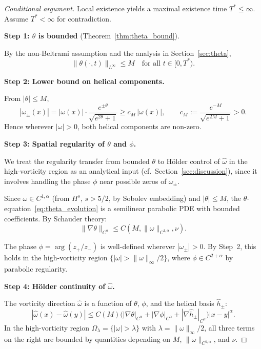 \documentclass[12pt,a4paper]{article}
\theoremstyle{definition}
\newcommand{\norm}[1]{\lVert #1 \rVert}
\begin{document}
\begin{proof}[Conditional argument]
Local existence yields a maximal existence time $T^* \leq \infty$. Assume $T^* < \infty$ for contradiction.

\medskip\noindent\textbf{Step 1: $\theta$ is bounded} (Theorem~\ref{thm:theta_bound}).

By the non-Beltrami assumption and the analysis in Section~\ref{sec:theta},
\begin{equation}
  \norm{\theta(\cdot,t)}_{L^\infty} \leq M \quad \text{for all } t \in [0, T^*).
\end{equation}

\medskip\noindent\textbf{Step 2: Lower bound on helical components.}

From $|\theta| \leq M$,
\begin{equation}
  |\omega_\pm(x)| = |\omega(x)| \cdot \frac{e^{\pm\theta}}{\sqrt{e^{2\theta} + 1}}
    \geq c_M\,|\omega(x)|, \qquad
  c_M := \frac{e^{-M}}{\sqrt{e^{2M}+1}} > 0.
\end{equation}
Hence wherever $|\omega| > 0$, both helical components are non-zero.

\medskip\noindent\textbf{Step 3: Spatial regularity of $\theta$ and $\phi$.}

We treat the regularity transfer from bounded $\theta$ to H\"older control of $\hat{\omega}$
in the high-vorticity region as an analytical input (cf.\ Section~\ref{sec:discussion}),
since it involves handling the phase $\phi$ near possible zeros of $\omega_\pm$.

Since $\omega \in C^{1,\alpha}$ (from $H^s$, $s > 5/2$, by Sobolev embedding) and $|\theta| \leq M$, the $\theta$-equation~\eqref{eq:theta_evolution} is a semilinear parabolic PDE with bounded coefficients. By Schauder theory:
\begin{equation}
  \norm{\nabla\theta}_{C^\alpha} \leq C(M, \norm{\omega}_{C^{1,\alpha}}, \nu).
\end{equation}

The phase $\phi = \arg(z_+/z_-)$ is well-defined wherever $|\omega_\pm| > 0$. By Step~2, this holds in the high-vorticity region $\{|\omega| > \norm{\omega}_\infty/2\}$, where $\phi \in C^{2+\alpha}$ by parabolic regularity.

\medskip\noindent\textbf{Step 4: H\"older continuity of $\hat{\omega}$.}

The vorticity direction $\hat{\omega}$ is a function of $\theta$, $\phi$, and the helical basis $\hat{h}_\pm$:
\begin{equation}
  |\hat{\omega}(x) - \hat{\omega}(y)| \leq C(M)\bigl(|\nabla\theta|_{C^\alpha} + |\nabla\phi|_{C^\alpha} + |\nabla\hat{h}_\pm|_{C^\alpha}\bigr)|x - y|^\alpha.
\end{equation}
In the high-vorticity region $\Omega_\lambda = \{|\omega| > \lambda\}$ with $\lambda = \norm{\omega}_\infty / 2$, all three terms on the right are bounded by quantities depending on $M$, $\norm{\omega}_{C^{1,\alpha}}$, and $\nu$.


\end{proof}
\end{document}
